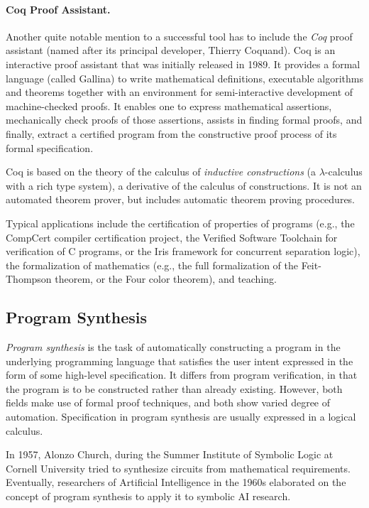 \paragraph{Coq Proof Assistant.}
Another quite notable mention to a successful tool has to include the \emph{Coq} proof assistant (named after its principal developer, Thierry Coquand). Coq is an interactive proof assistant that was initially released in 1989. It provides a formal language (called Gallina) to write mathematical definitions, executable algorithms and theorems together with an environment for semi-interactive development of machine-checked proofs. It enables one to express mathematical assertions, mechanically check proofs of those assertions, assists in finding formal proofs, and finally, extract a certified program from the constructive proof process of its formal specification.

Coq is based on the theory of the calculus of \emph{inductive constructions} (a $\lambda$-calculus with a rich type system), a derivative of the calculus of constructions. It is not an automated theorem prover, but includes automatic theorem proving procedures.

Typical applications include the certification of properties of programs (e.g., the CompCert compiler certification project, the Verified Software Toolchain for verification of C programs, or the Iris framework for concurrent separation logic), the formalization of mathematics (e.g., the full formalization of the Feit-Thompson theorem, or the Four color theorem), and teaching.


\subsection{Program Synthesis}

\emph{Program synthesis} is the task of automatically constructing a program in the underlying programming language that satisﬁes the user intent expressed in the form of some high-level speciﬁcation. It differs from program verification, in that the program is to be constructed rather than already existing. However, both fields make use of formal proof techniques, and both show varied degree of automation. Specification in program synthesis are usually expressed in a logical calculus.

In 1957, Alonzo Church, during the Summer Institute of Symbolic Logic at Cornell University tried to synthesize circuits from mathematical requirements. Eventually, researchers of Artificial Intelligence in the 1960s elaborated on the concept of program synthesis to apply it to symbolic AI research.

